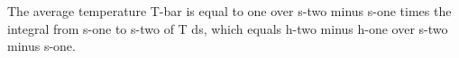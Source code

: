 The average temperature T-bar is equal to one over s-two minus s-one times the integral from s-one to s-two of T ds, which equals h-two minus h-one over s-two minus s-one.